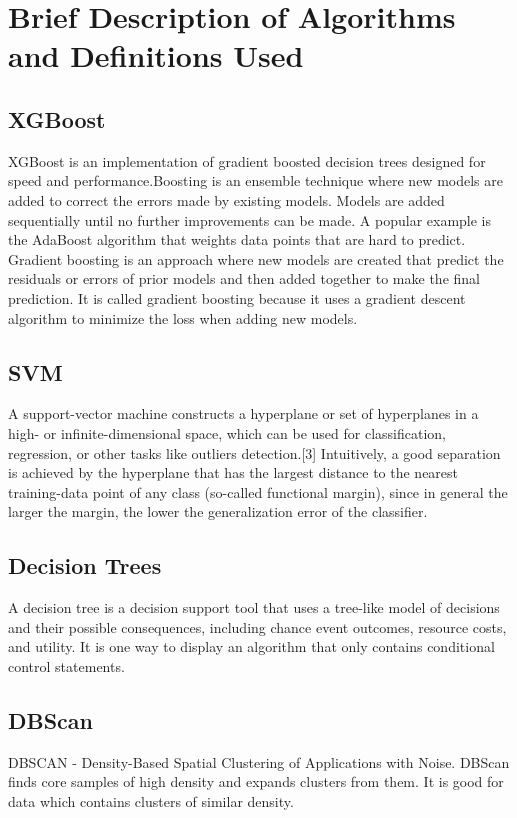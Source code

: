 \documentclass[10pt]{article}
\begin{document}
\section{Brief Description of Algorithms and Definitions Used}
\subsection{XGBoost}
XGBoost is an implementation of gradient boosted decision trees designed
for speed and performance.Boosting is an ensemble technique where new
models are added to correct the errors made by existing models. Models are
added sequentially until no further improvements can be made. A popular
example is the AdaBoost algorithm that weights data points that are hard
to predict. Gradient boosting is an approach where new models are created
that predict the residuals or errors of prior models and then added
together to make the final prediction. It is called gradient boosting
because it uses a gradient descent algorithm to minimize the loss when
adding new models.\par
\subsection{SVM}
A support-vector machine constructs a hyperplane or set of hyperplanes in a
high- or infinite-dimensional space, which can be used for classification,
regression, or other tasks like outliers detection.[3] Intuitively, a good
separation is achieved by the hyperplane that has the largest distance to
the nearest training-data point of any class (so-called functional margin),
since in general the larger the margin, the lower the generalization error
of the classifier.\par
\subsection{Decision Trees}
A decision tree is a decision support tool that uses a tree-like model of
decisions and their possible consequences, including chance event outcomes,
resource costs, and utility. It is one way to display an algorithm that
only contains conditional control statements.\par
\subsection{DBScan}
DBSCAN - Density-Based Spatial Clustering of Applications with Noise.
DBScan finds core samples of high density and expands clusters from them.
It is good for data which contains clusters of similar density.
\end{document}

